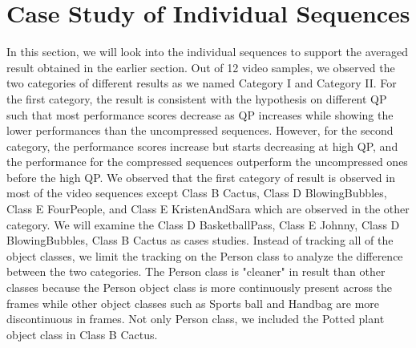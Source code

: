 \section{Case Study of Individual Sequences}
\label{sec:results/section_b}

In this section, we will look into the individual sequences to support the averaged result obtained in the earlier section. Out of 12 video samples, we observed the two categories of different results as we named Category I and Category II. For the first category, the result is consistent with the hypothesis on different QP such that most performance scores decrease as QP increases while showing the lower performances than the uncompressed sequences. However, for the second category, the performance scores increase but starts decreasing at high QP, and the performance for the compressed sequences outperform the uncompressed ones before the high QP. We observed that the first category of result is observed in most of the video sequences except Class B Cactus, Class D BlowingBubbles, Class E FourPeople, and Class E KristenAndSara which are observed in the other category. We will examine the Class D BasketballPass, Class E Johnny, Class D BlowingBubbles, Class B Cactus as cases studies. Instead of tracking all of the object classes, we limit the tracking on the Person class to analyze the difference between the two categories. The Person class is "cleaner" in result than other classes because the Person object class is more continuously present across the frames while other object classes such as Sports ball and Handbag are more discontinuous in frames. Not only Person class, we included the Potted plant object class in Class B Cactus.


